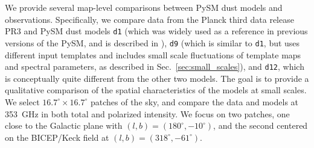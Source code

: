 \documentclass[twocolumn]{aastex631}
\begin{document}

We provide several map-level comparisons between PySM dust models and observations. 
Specifically, we compare data from the Planck third data release PR3 \cite{planck2016-l03} and PySM dust models \texttt{d1} (which was widely used as a reference in previous versions of the PySM, and is described in \cite{Thorne:2017}), {\tt d9} (which is similar to \texttt{d1}, but uses different input templates and includes small scale fluctuations of template maps and spectral parameters, as described in Sec.~\ref{sec:small_scales}), and {\tt d12}, which is conceptually quite different from the other two models. The goal is to provide a qualitative comparison of the spatial characteristics of the models at small scales. We select $16.7^\circ \times 16.7^\circ$ patches of the sky, and compare the data and models at 353~GHz in both total and polarized intensity. We focus on two patches, one close to the Galactic plane with $(l,b) =(180^\circ,-10^\circ)$, and the second centered on the BICEP/Keck field at $(l,b) =(318^\circ,-61^\circ)$. 

\end{document}
